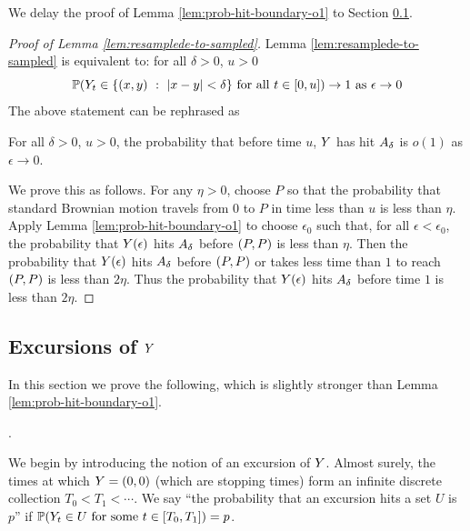 {We delay the proof of Lemma \ref{lem:prob-hit-boundary-o1} to Section
\ref{subsec:excursions-of-twodim}.

\begin{proof}[Proof of Lemma \ref{lem:resamplede-to-sampled}]

Lemma \ref{lem:resamplede-to-sampled} is equivalent to: for all $\delta > 0$, $u > 0$
\[
\P(\twodim_t \in \{(x,y) \ :\  |x-y|<\delta \} \text{ for all } t \in [0,u])\to1 \text{ as } \epsilon\to 0
\]
The above statement can be rephrased as

\vspace{12pt}
For all $\delta > 0$, $u > 0$,
the probability that before time $u$, $Y$ has hit $A_\delta$
is $o(1)$ as $\epsilon \to 0$.
\vspace{12pt}

  We prove this as follows.  For any $\eta > 0$,
  choose $P$ so that the probability that standard Brownian motion
  travels from $0$ to $P$ in time less than $u$ is less than
  $\eta$.
  Apply Lemma \ref{lem:prob-hit-boundary-o1} to
  choose $\epsilon_0$ such that, for all $\epsilon < \epsilon_0$, the probability that $Y(\epsilon)$ hits
  $A_\delta$ before $(P,P)$ is less than $\eta$.
  Then the probability that $Y(\epsilon)$ hits $A_\delta$ before $(P,P)$
  or takes less time than $1$ to reach $(P,P)$ is
  less than $2\eta$.
  Thus the probability that $Y(\epsilon)$ hits $A_\delta$ before
  time $1$ is less than $2\eta$.
\end{proof}

\subsection{Excursions of $Y$}
\label{subsec:excursions-of-twodim}

In this section we prove the following, which is slightly stronger than
Lemma \ref{lem:prob-hit-boundary-o1}.

\newcommand{\loger}{\log 1/\epsilon}

\begin{lemma}\label{lem:prob-hit-boundary-o1loge}
  \probhitboundaryis{$O(\frac{1}{\loger})$}.
\end{lemma}

\newcommand{\origin}{(0,0)}

\newcommand{\excursionstart}{T}
  We begin by introducing the notion of an excursion of $Y$.
  Almost surely, the times at which $\twodim = \origin$ (which are stopping
  times) form an infinite discrete collection $\excursionstart_0 <
  \excursionstart_1 < \cdots$. We say ``the probability that an excursion
  hits a set $U$ is $p$'' if $\P(\twodim_t\in U \text{
  for some } t\in [\excursionstart_0, \excursionstart_{1}]) = p$.

}
